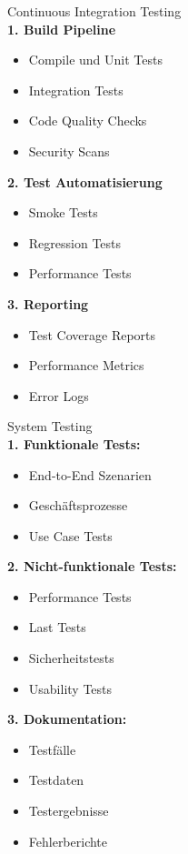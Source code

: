 \begin{KR}{Continuous Integration Testing}\\
\textbf{1. Build Pipeline}
\begin{itemize}
   \item Compile und Unit Tests
   \item Integration Tests
   \item Code Quality Checks
   \item Security Scans
\end{itemize}

\textbf{2. Test Automatisierung}
\begin{itemize}
   \item Smoke Tests
   \item Regression Tests
   \item Performance Tests
\end{itemize}

\textbf{3. Reporting}
\begin{itemize}
   \item Test Coverage Reports
   \item Performance Metrics
   \item Error Logs
\end{itemize}
\end{KR}



\begin{KR}{System Testing}\\
\textbf{1. Funktionale Tests:}
\begin{itemize}
   \item End-to-End Szenarien
   \item Geschäftsprozesse
   \item Use Case Tests
\end{itemize}

\textbf{2. Nicht-funktionale Tests:}
\begin{itemize}
   \item Performance Tests
   \item Last Tests
   \item Sicherheitstests
   \item Usability Tests
\end{itemize}

\textbf{3. Dokumentation:}
\begin{itemize}
   \item Testfälle
   \item Testdaten
   \item Testergebnisse
   \item Fehlerberichte
\end{itemize}
\end{KR}


